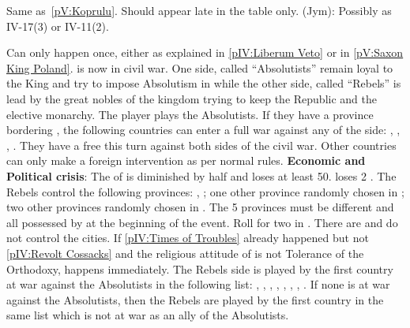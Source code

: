 
Same as~\ref{pV:Koprulu}. Should appear late in the table only. (Jym):
Possibly as IV-17(3) or IV-11(2).

\vfill \pagebreak



\vfill \pagebreak





\phevnt
\aparag Can only happen once, either as explained in \ref{pIV:Liberum Veto} or
in \ref{pV:Saxon King Poland}.
\aparag \POL is now in civil war. One side, called ``Absolutists'' remain
loyal to the King and try to impose Absolutism in \POL while the other side,
called ``Rebels'' is lead by the great nobles of the kingdom trying to keep
the Republic and the elective monarchy.
\bparag The player plays the Absolutists.
\aparag If they have a province bordering \POL, the following countries can
enter a full war against any of the side: \RUS, \SUE, \HAB, \PRU.
\bparag They have a free \CB this turn against both sides of the civil war.
\bparag Other countries can only make a foreign intervention as per normal
rules.
\aparag \textbf{Economic and Political crisis}: The \RT of \POL is diminished
by half and loses at least 50\ducats. \POL loses 2 \STAB.
\aparag The Rebels control the following provinces:
\bparag \provinceMalopolska, \provinceLietuva ;
\bparag one other province randomly chosen in \paysmajeurPologne;
\bparag two other provinces randomly chosen in \paysmajeurLithuanie.
\bparag The 5 provinces must be different and all possessed by \POL at the
beginning of the event.
\aparag Roll for two \REVOLT in \POL. There are \facemoins and do not control
the cities.
\aparag If \ref{pIV:Times of Troubles} already happened but not
\ref{pIV:Revolt Cossacks} and the religious attitude of \POL is not Tolerance
of the Orthodoxy,  happens immediately.
\aparag The Rebels side is played by the first country at war against the
Absolutists in the following list: \RUS, \SUE, \HAB, \TUR, \HOL, \ANG, \FRA,
\PRU.
\bparag If none is at war against the Absolutists, then the Rebels are played
by the first country in the same list which is not at war as an ally of the
Absolutists.

